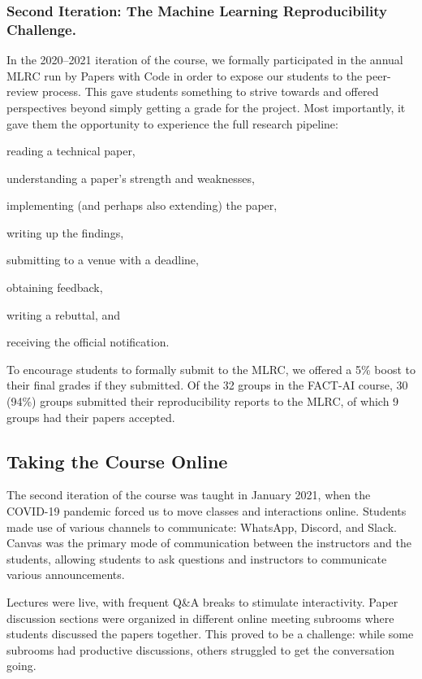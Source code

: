 \documentclass[letterpaper]{article}
\begin{document}
\subsubsection{Second Iteration: The Machine Learning Reproducibility Challenge.}
In the 2020--2021 iteration of the course, we formally participated in the annual MLRC run by Papers with Code \citep{paperswithcode2020} in order to expose our students to the peer-review process.
This gave students something to strive towards and offered perspectives beyond simply getting a grade for the project.
Most importantly, it gave them the opportunity to experience the full research pipeline:
\begin{enumerate*}[label=(\roman*)]
	\item reading a technical paper,
	\item understanding a paper's strength and weaknesses,
	\item implementing (and perhaps also extending) the paper,
	\item writing up the findings,
	\item submitting to a venue with a deadline,
	\item obtaining feedback,
	\item writing a rebuttal, and
	\item receiving the official notification.
\end{enumerate*}
To encourage students to formally submit to the MLRC, we offered a 5\% boost to their final grades if they submitted.
Of the 32 groups in the FACT-AI course, 30 (94\%) groups submitted their reproducibility reports to the MLRC, of which 9 groups had their papers accepted.

\subsection{Taking the Course Online}
The second iteration of the course was taught in January 2021, when the COVID-19 pandemic forced us to move classes and interactions online.
Students made use of various channels to communicate: WhatsApp, Discord, and Slack.
Canvas was the primary mode of communication between the instructors and the students, allowing students to ask questions and instructors to communicate various announcements.

Lectures were live, with frequent Q\&A breaks to stimulate interactivity.
Paper discussion sections were organized in different online meeting subrooms where students discussed the papers together.
This proved to be a challenge: while some subrooms had productive discussions, others struggled to get the conversation going.
\end{document}
